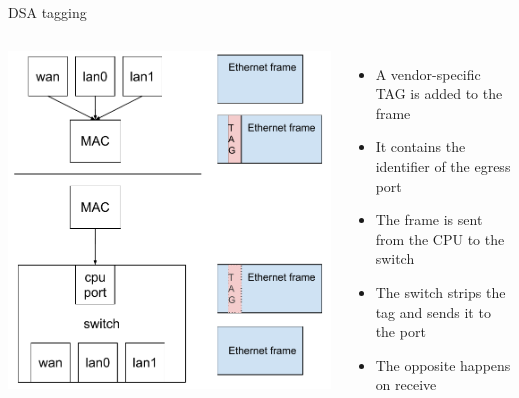 \begin{frame}{DSA tagging}
	\begin{columns}
		\includegraphics[width=\textwidth]{slides/networking-driver-switch/dsa_tagging.pdf}
	\begin{itemize}
		\item A vendor-specific TAG is added to the frame
		\item It contains the identifier of the egress port
		\item The frame is sent from the CPU to the switch
		\item The switch strips the tag and sends it to the port
		\item The opposite happens on receive
	\end{itemize}
	\end{columns}

\end{frame}

